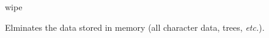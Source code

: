 \begin{command}{wipe}{}

	\syntax{\obligatory{()}}

	\begin{poydescription}
        Elminates the data stored in memory (all character data, trees, \emph{etc.}).
	\end{poydescription}

    \begin{poyexamples}
    \end{poyexamples}
\end{command}
           
